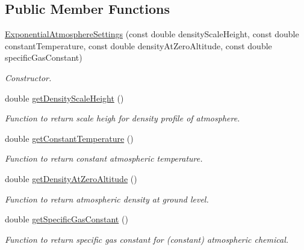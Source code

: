 \subsection*{Public Member Functions}
\begin{DoxyCompactItemize}
\item 
\hyperlink{classtudat_1_1simulation__setup_1_1ExponentialAtmosphereSettings_a315a4d1d2e2faf3662a847685f34e1d3}{Exponential\+Atmosphere\+Settings} (const double density\+Scale\+Height, const double constant\+Temperature, const double density\+At\+Zero\+Altitude, const double specific\+Gas\+Constant)
\begin{DoxyCompactList}\small\item\em Constructor. \end{DoxyCompactList}\item 
double \hyperlink{classtudat_1_1simulation__setup_1_1ExponentialAtmosphereSettings_ae2654f691fa13bd913d052300376a5cd}{get\+Density\+Scale\+Height} ()
\begin{DoxyCompactList}\small\item\em Function to return scale heigh for density profile of atmosphere. \end{DoxyCompactList}\item 
double \hyperlink{classtudat_1_1simulation__setup_1_1ExponentialAtmosphereSettings_a7726581a154975351ff48e426788e8af}{get\+Constant\+Temperature} ()
\begin{DoxyCompactList}\small\item\em Function to return constant atmospheric temperature. \end{DoxyCompactList}\item 
double \hyperlink{classtudat_1_1simulation__setup_1_1ExponentialAtmosphereSettings_a4c7022b628cf8055728eba4df03f37cc}{get\+Density\+At\+Zero\+Altitude} ()
\begin{DoxyCompactList}\small\item\em Function to return atmospheric density at ground level. \end{DoxyCompactList}\item 
double \hyperlink{classtudat_1_1simulation__setup_1_1ExponentialAtmosphereSettings_a5377998853c2e147b149ed7a8c92842a}{get\+Specific\+Gas\+Constant} ()
\begin{DoxyCompactList}\small\item\em Function to return specific gas constant for (constant) atmospheric chemical. \end{DoxyCompactList}\end{DoxyCompactItemize}


